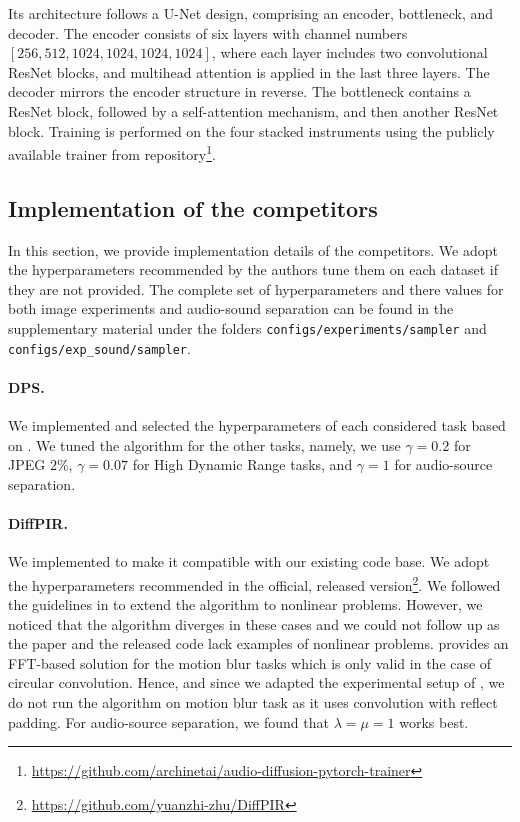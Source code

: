Its architecture follows a U-Net design, comprising an encoder, bottleneck, and decoder. The encoder consists of six layers with channel numbers $[256, 512, 1024, 1024, 1024, 1024]$, where each layer includes two convolutional ResNet blocks, and multihead attention is applied in the last three layers. The decoder mirrors the encoder structure in reverse. The bottleneck contains a ResNet block, followed by a self-attention mechanism, and then another ResNet block. Training is performed on the four stacked instruments using the publicly available trainer from repository\footnote{\url{https://github.com/archinetai/audio-diffusion-pytorch-trainer}}.

\subsection{Implementation of the competitors}
\label{apdx:competitors}
In this section, we provide implementation details of the competitors.
We adopt the hyperparameters recommended by the authors tune them on each dataset if they are not provided.
The complete set of hyperparameters and there values for both image experiments and audio-sound separation can be found in the supplementary material under the folders \texttt{configs\slash experiments/sampler} and \texttt{configs\slash exp\_sound/sampler}.


\paragraph*{DPS.}
We implemented \citet[Algorithm~1]{chung2023diffusion} and selected the hyperparameters of each considered task  based on \citet[App.~D]{chung2023diffusion}.
We tuned the algorithm for the other tasks, namely, we use $\gamma = 0.2$ for JPEG $2\%$, $\gamma = 0.07$ for High Dynamic Range tasks, and $\gamma = 1$ for audio-source separation.

\paragraph*{DiffPIR.}
We implemented \citet[Algorithm 1]{zhu2023denoising} to make it compatible with our existing code base.
We adopt the hyperparameters recommended in the official, released version\footnote{\url{https://github.com/yuanzhi-zhu/DiffPIR}}.
We followed the guidelines in \citep[Eqn. (13)]{zhu2023denoising} to extend the algorithm to nonlinear problems.
However, we noticed that the algorithm diverges in these cases and we could not follow up as the paper and the released code lack examples of nonlinear problems.
\citet{zhu2023denoising} provides an FFT-based solution for the motion blur tasks which is only valid in the case of circular convolution.
Hence, and since we adapted the experimental setup of \citet{chung2023diffusion}, we do not run the algorithm on motion blur task as it uses convolution with reflect padding. For audio-source separation, we found that $\lambda = \mu = 1$ works best.

